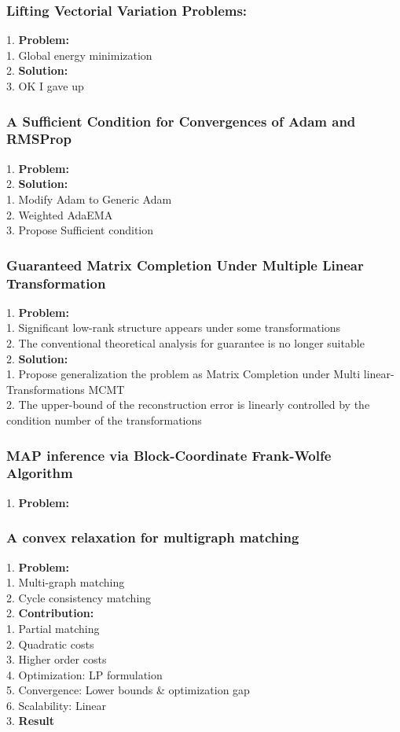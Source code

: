 \subsubsection{Lifting Vectorial Variation Problems:}
    1. {\bf Problem:} \\
        1. Global energy minimization \\
    2. {\bf Solution:} \\
    3. OK I gave up \\
\subsubsection{A Sufficient Condition for Convergences of Adam and RMSProp}
    1. {\bf Problem:} \\
    2. {\bf Solution:} \\
        1. Modify Adam to Generic Adam \\
        2. Weighted AdaEMA \\
        3. Propose Sufficient condition \\
\subsubsection{Guaranteed Matrix Completion Under Multiple Linear Transformation}
    1. {\bf Problem:} \\
        1. Significant low-rank structure appears under some transformations \\
        2. The conventional theoretical analysis for guarantee is no longer suitable \\
    2. {\bf Solution:} \\
        1. Propose generalization the problem as Matrix Completion under Multi linear-Transformations MCMT \\
        2. The upper-bound of the reconstruction error is linearly controlled by the condition number of the transformations \\
\subsubsection{MAP inference via Block-Coordinate Frank-Wolfe Algorithm}
    1. {\bf Problem:} \\
\subsubsection{A convex relaxation for multigraph matching}
    1. {\bf Problem:} \\
        1. Multi-graph matching \\
        2. Cycle consistency matching \\
    2. {\bf Contribution:} \\
        1. Partial matching \\
        2. Quadratic costs \\
        3. Higher order costs \\
        4. Optimization: LP formulation \\
        5. Convergence: Lower bounds \& optimization gap \\
        6. Scalability: Linear \\
    3. {\bf Result} \\